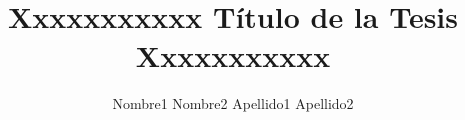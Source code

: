 \renewcommand{\thechapter}{\Roman{chapter}}
\renewcommand{\theequation}{\arabic{chapter}.\arabic{equation}} 
\renewcommand{\thesection}{\arabic{chapter}.\arabic{section}}  
\renewcommand{\thetable}{\arabic{chapter}.\arabic{table}}  
\renewcommand{\thefigure}{\arabic{chapter}.\arabic{figure}}




\author{Nombre1 Nombre2 Apellido1 Apellido2}


\title{Xxxxxxxxxxx Título de la Tesis Xxxxxxxxxxx}






